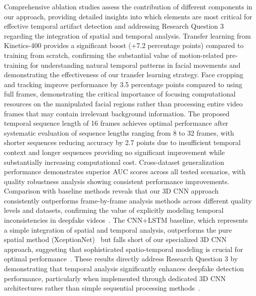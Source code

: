 \documentclass[conference]{IEEEtran}
\begin{document}
Comprehensive ablation studies assess the contribution of different components in our approach, providing detailed insights into which elements are most critical for effective temporal artifact detection and addressing Research Question 3 regarding the integration of spatial and temporal analysis.
Transfer learning from Kinetics-400 provides a significant boost (+7.2 percentage points) compared to training from scratch, confirming the substantial value of motion-related pre-training for understanding natural temporal patterns in facial movements and demonstrating the effectiveness of our transfer learning strategy.
Face cropping and tracking improve performance by 3.5 percentage points compared to using full frames, demonstrating the critical importance of focusing computational resources on the manipulated facial regions rather than processing entire video frames that may contain irrelevant background information.
The proposed temporal sequence length of 16 frames achieves optimal performance after systematic evaluation of sequence lengths ranging from 8 to 32 frames, with shorter sequences reducing accuracy by 2.7 points due to insufficient temporal context and longer sequences providing no significant improvement while substantially increasing computational cost.
Cross-dataset generalization performance demonstrates superior AUC scores across all tested scenarios, with quality robustness analysis showing consistent performance improvements.
Comparison with baseline methods reveals that our 3D CNN approach consistently outperforms frame-by-frame analysis methods across different quality levels and datasets, confirming the value of explicitly modeling temporal inconsistencies in deepfake videos~\cite{tran2015learning}.
The CNN+LSTM baseline, which represents a simple integration of spatial and temporal analysis, outperforms the pure spatial method (XceptionNet)~\cite{rossler2019faceforensics} but falls short of our specialized 3D CNN approach, suggesting that sophisticated spatio-temporal modeling is crucial for optimal performance~\cite{carreira2017quo}.
These results directly address Research Question 3 by demonstrating that temporal analysis significantly enhances deepfake detection performance, particularly when implemented through dedicated 3D CNN architectures rather than simple sequential processing methods~\cite{sabir2019recurrent}.
\end{document}
